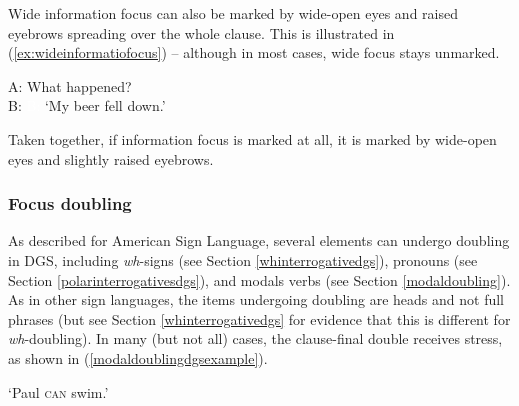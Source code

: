 \noindent Wide information focus can also be marked by wide-open eyes and raised eyebrows spreading over the whole clause. This is illustrated in (\ref{ex:wideinformatiofocus}) -- although in most cases, wide focus stays unmarked. %

\begin{exe}
\ex
A: What happened? \\
B: 
%
\glt \textcolor{white}{B: }`My beer fell down.' \label{ex:wideinformatiofocus}

\end{exe}

\noindent Taken together, if information focus is marked at all, it is marked by wide-open eyes and slightly raised eyebrows. 



\subsubsection{Focus doubling}
As described for American Sign Language, several elements can undergo doubling in DGS, including \textit{wh}-signs (see Section \ref{whinterrogativedgs}), pronouns (see Section \ref{polarinterrogativesdgs}), and modals verbs (see Section \ref{modaldoubling}). As in other sign languages, the items undergoing doubling are heads and not full phrases (but see Section \ref{whinterrogativedgs} for evidence that this is different for \textit{wh}-doubling). In many (but not all) cases, the clause-final double receives stress, as shown in (\ref{modaldoublingdgsexample}). 

\begin{exe}
\ex {} 
\glt `Paul \textsc{can} swim.' \label{modaldoublingdgsexample}
\end{exe}

